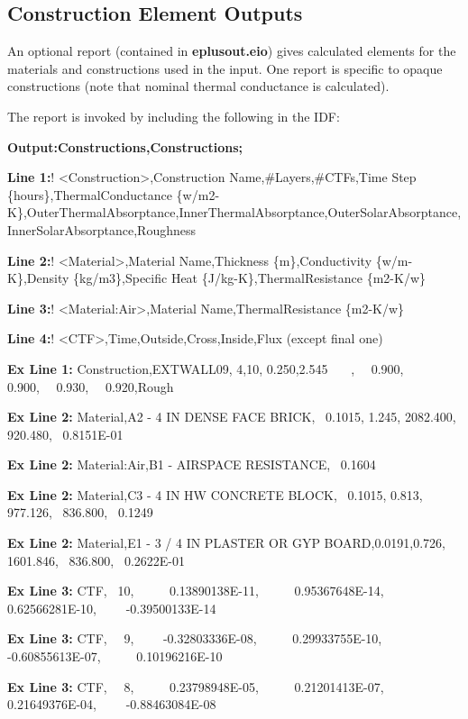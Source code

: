 \subsection{Construction Element Outputs}\label{construction-element-outputs}

An optional report (contained in \textbf{eplusout.eio}) gives calculated elements for the materials and constructions used in the input. One report is specific to opaque constructions (note that nominal thermal conductance is calculated).

The report is invoked by including the following in the IDF:

\textbf{Output:Constructions,Constructions;}

\textbf{Line 1:}! \textless{}Construction\textgreater{},Construction Name,\#Layers,\#CTFs,Time Step \{hours\},ThermalConductance \{w/m2-K\},OuterThermalAbsorptance,InnerThermalAbsorptance,OuterSolarAbsorptance,InnerSolarAbsorptance,Roughness

\textbf{Line 2:}! \textless{}Material\textgreater{},Material Name,Thickness \{m\},Conductivity \{w/m-K\},Density \{kg/m3\},Specific Heat \{J/kg-K\},ThermalResistance \{m2-K/w\}

\textbf{Line 3:}! \textless{}Material:Air\textgreater{},Material Name,ThermalResistance \{m2-K/w\}

\textbf{Line 4:}! \textless{}CTF\textgreater{},Time,Outside,Cross,Inside,Flux (except final one)

\textbf{Ex Line 1:} Construction,EXTWALL09, 4,10, 0.250,2.545~~~ ,~~ 0.900,~~ 0.900,~~ 0.930,~~ 0.920,Rough

\textbf{Ex Line 2:} Material,A2 - 4 IN DENSE FACE BRICK,~ 0.1015, 1.245, 2082.400, 920.480,~ 0.8151E-01

\textbf{Ex Line 2:} Material:Air,B1 - AIRSPACE RESISTANCE,~ 0.1604

\textbf{Ex Line 2:} Material,C3 - 4 IN HW CONCRETE BLOCK,~ 0.1015, 0.813,~ 977.126,~ 836.800,~ 0.1249

\textbf{Ex Line 2:} Material,E1 - 3 / 4 IN PLASTER OR GYP BOARD,0.0191,0.726, 1601.846,~ 836.800,~ 0.2622E-01

\textbf{Ex Line 3:} CTF,~ 10,~~~~~ 0.13890138E-11,~~~~~ 0.95367648E-14,~~~~~ 0.62566281E-10,~~~~ -0.39500133E-14

\textbf{Ex Line 3:} CTF,~~ 9,~~~~ -0.32803336E-08,~~~~~ 0.29933755E-10,~~~~ -0.60855613E-07,~~~~~ 0.10196216E-10

\textbf{Ex Line 3:} CTF,~~ 8,~~~~~ 0.23798948E-05,~~~~~ 0.21201413E-07,~~~~~ 0.21649376E-04,~~~~ -0.88463084E-08

